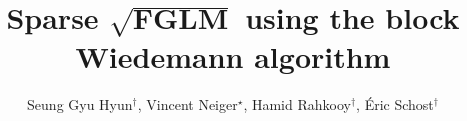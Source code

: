 \documentclass[final]{beamer}
\title{Sparse 
	$\mathbf{\sqrt{FGLM}}$ using the block Wiedemann algorithm} %
\author{Seung Gyu Hyun$^\dagger$, Vincent Neiger$^\star$, Hamid Rahkooy$^\dagger$, \'Eric Schost$^\dagger$} %
\institute{$^\dagger$ University of Waterloo, $^\star$ DTU Compute} %
\newlength{\sepwid}
\newlength{\onecolwid}
\begin{document}

\setlength{\belowcaptionskip}{2ex} %
\setlength\belowdisplayshortskip{2ex} %

\begin{frame}[t] %

\begin{columns}[t] %

\begin{column}{\sepwid}\end{column} %

\begin{column}{\onecolwid} %







\end{column}
\end{columns}
\end{frame}
\end{document}
